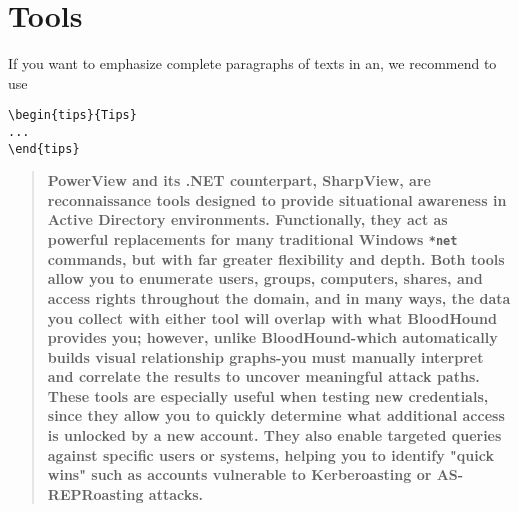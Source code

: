 \renewcommand{\tipbox}[1]{\begin{quote}\textbf{#1}\end{quote}}
%
%
%
\chapter{Tools}
\label{intro} %

If you want to emphasize complete paragraphs of texts in an, we recommend to
use  \begin{verbatim}\begin{tips}{Tips}
...
\end{tips}\end{verbatim}
%
%
\tipbox {\textbf{PowerView} and its .NET counterpart, \textbf{SharpView}, are reconnaissance tools designed to provide situational awareness in Active Directory environments. Functionally, they act as powerful replacements for many traditional Windows \texttt{*net} commands, but with far greater flexibility and depth. Both tools allow you to enumerate users, groups, computers, shares, and access rights throughout the domain, and in many ways, the data you collect with either tool will overlap with what BloodHound provides you; however, unlike BloodHound-which automatically builds visual relationship graphs-you must manually interpret and correlate the results to uncover meaningful attack paths. These tools are especially useful when testing new credentials, since they allow you to quickly determine what additional access is unlocked by a new account. They also enable targeted queries against specific users or systems, helping you to identify "quick wins" such as accounts vulnerable to Kerberoasting or AS-REPRoasting attacks.}

